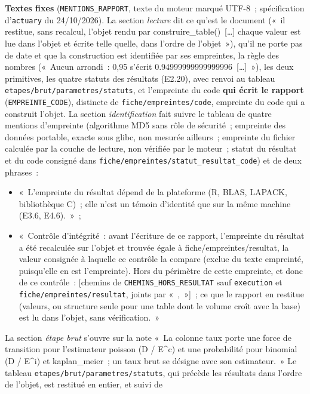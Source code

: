 \documentclass[a4paper,11pt]{article}
\newcommand{\code}[1]{\texttt{\small #1}}
\begin{document}
\medskip
\noindent
\textbf{Textes fixes} (\code{MENTIONS\_RAPPORT}, texte du moteur marqué
UTF-8~; spécification d'\code{actuary} du 24/10/2026). La section
\emph{lecture} dit ce qu'est le document («~il restitue, sans recalcul,
l'objet rendu par construire\_table()~[\ldots] chaque valeur est lue dans
l'objet et écrite telle quelle, dans l'ordre de l'objet~»), qu'il ne porte
pas de date et que la construction est identifiée par ses empreintes, la
règle des nombres («~Aucun arrondi~: 0,95 s'écrit 0.94999999999999996~[\ldots]~»),
les deux primitives, les quatre statuts des résultats (E2.20), avec renvoi
au tableau \code{etapes/brut/parametres/statuts}, et l'empreinte du code
\textbf{qui écrit le rapport} (\code{EMPREINTE\_CODE}), distincte de
\code{fiche/empreintes/code}, empreinte du code qui a construit l'objet.
La section \emph{identification} fait suivre le tableau de quatre mentions
d'empreinte (algorithme MD5 sans rôle de sécurité~; empreinte des données
portable, exacte sous glibc, non mesurée ailleurs~; empreinte du fichier
calculée par la couche de lecture, non vérifiée par le moteur~; statut du
résultat et du code consigné dans \code{fiche/empreintes/statut\_resultat\_code})
et de deux phrases~:
\begin{itemize}[leftmargin=*, itemsep=2pt]
  \item «~L'empreinte du résultat dépend de la plateforme (R, BLAS, LAPACK,
    bibliothèque C)~; elle n'est un témoin d'identité que sur la même machine
    (E3.6, E4.6).~»~;
  \item «~Contrôle d'intégrité~: avant l'écriture de ce rapport, l'empreinte
    du résultat a été recalculée sur l'objet et trouvée égale à
    fiche/empreintes/resultat, la valeur consignée à laquelle ce contrôle la
    compare (exclue du texte empreinté, puisqu'elle en est l'empreinte).
    Hors du périmètre de cette empreinte, et donc de ce contrôle~: [chemins
    de \code{CHEMINS\_HORS\_RESULTAT} sauf \code{execution} et
    \code{fiche/empreintes/resultat}, joints par «~,~»]~; ce que le rapport en restitue
    (valeurs, ou structure seule pour une table dont le volume croît avec la
    base) est lu dans l'objet, sans vérification.~»
\end{itemize}
La section \emph{étape brut} s'ouvre sur la note «~La colonne taux porte une
force de transition pour l'estimateur poisson (D / E\^{}c) et une probabilité
pour binomial (D / E\^{}i) et kaplan\_meier~; un taux brut se désigne avec son
estimateur.~» Le tableau \code{etapes/brut/parametres/statuts}, qui précède
les résultats dans l'ordre de l'objet, est restitué en entier, et suivi de
\end{document}
